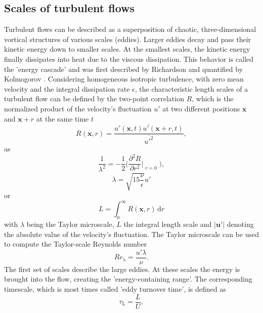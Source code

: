 \documentclass[11pt,a4paper,openany,oneside,parskip=half*]{article}
\renewcommand*\vec[1]{\boldsymbol{#1}}
\begin{document}
\subsection{Scales of turbulent flows}
Turbulent flows can be described as a superposition of chaotic, three-dimensional vortical structures of various scales (eddies). Larger eddies decay and pass their kinetic energy down to smaller scales. At the smallest scales, the kinetic energy finally dissipates into heat due to the viscous dissipation. This behavior is called the 'energy cascade' and was first described by Richardson \cite{Richardson1920} and quantified by Kolmogorov \cite{Kolmogorov1941}.
\newline
Considering homogeneous isotropic turbulence, with zero mean velocity and the integral dissipation rate $\epsilon$, the characteristic length scales of a turbulent flow can be defined by the two-point correlation $R$, which is the normalized product of the velocity's fluctuation $u'$ at two different positions 
$\vec{x}$ and $\vec{x} + r$ at the same time $t$
\begin{equation}
R (\vec{x}, r) = \frac{\overline{u'(\vec{x}, t)u'(\vec{x} + r, t)}}{\overline{u'^2}},
\end{equation}
as
\begin{equation}
 \frac{1}{\lambda^2} = -\frac{1}{2}\biggl(\frac{\partial^2 R}{\partial r^2}\Bigr|_{\substack{r=0}}\biggl),
\end{equation}
\begin{equation}
\lambda = \sqrt{15 \frac{\nu}{\epsilon}} u'
\end{equation}
or
\begin{equation} \label{eq:integralLengthScale}
L = \int_{0}^{\infty} R (\vec{x}, r)  \, \mathrm{d}r
\end{equation}
with $\lambda$ being the Taylor microscale, $L$ the integral length scale and $|\vec{u'}|$ denoting the absolute value of the velocity's fluctuation.
\newline
The Taylor microscale can be used to compute the Taylor-scale Reynolds number
\begin{equation}
Re_\mathrm{\lambda} = \frac{u' \lambda}{\nu}.
\end{equation}
\newline
The first set of scales describe the large eddies. At these scales the energy is brought into the flow, creating the 'energy-containing range'. The corresponding timescale, which is most times called 'eddy turnover time', is defined as
\begin{equation}
\tau_\mathrm{L} = \frac{L}{U},
\end{equation}
\end{document}
